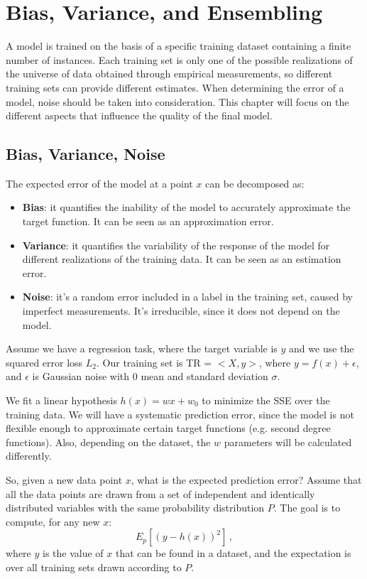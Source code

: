 \chapter{Bias, Variance, and Ensembling}

A model is trained on the basis of a specific training dataset containing a finite number of instances. Each training set is only one of the possible realizations of the universe of data obtained through empirical measurements, so different training sets can provide different estimates. When determining the error of a model, noise should be taken into consideration. This chapter will focus on the different aspects that influence the quality of the final model.

\section{Bias, Variance, Noise}

The expected error of the model at a point $x$ can be decomposed as:
\begin{itemize}
    \item \textbf{Bias}: it quantifies the inability of the model to accurately approximate the target function. It can be seen as an approximation error.

    \item \textbf{Variance}: it quantifies the variability of the response of the model for different realizations of the training data. It can be seen as an estimation error.

    \item \textbf{Noise}: it's a random error included in a label in the training set, caused by imperfect measurements. It's irreducible, since it does not depend on the model.
\end{itemize}

Assume we have a regression task, where the target variable is $y$ and we use the squared error loss $L_2$. Our training set is TR = $< X, y >$, where $y = f(x) + \epsilon$, and $\epsilon$ is Gaussian noise with 0 mean and standard deviation $\sigma$.

We fit a linear hypothesis $h(x) = wx + w_0$ to minimize the SSE over the training data. We will have a systematic prediction error, since the model is not flexible enough to approximate certain target functions (e.g. second degree functions). Also, depending on the dataset, the $w$ parameters will be calculated differently.

So, given a new data point $x$, what is the expected prediction error? Assume that all the data points are drawn from a set of independent and identically distributed variables with the same probability distribution $P$. The goal is to compute, for any new $x$:
\begin{equation*}
    E_p [(y-h(x))^2] \,,
\end{equation*}
where $y$ is the value of $x$ that can be found in a dataset, and the expectation is over all training sets drawn according to $P$.

